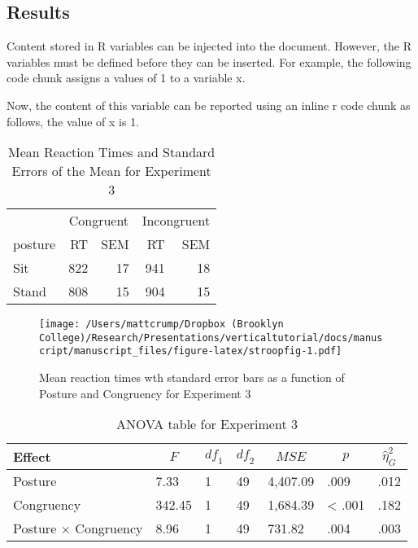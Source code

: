 \documentclass[
  man]{apa6}
\begin{document}
\hypertarget{results}{%
\subsection{Results}\label{results}}

Content stored in R variables can be injected into the document. However, the R variables must be defined before they can be inserted. For example, the following code chunk assigns a values of 1 to a variable x.

Now, the content of this variable can be reported using an inline r code chunk as follows, the value of x is 1.

\begin{table}

\caption{\label{tab:meanstable}Mean Reaction Times and Standard Errors of the Mean for Experiment 3}
\centering
\begin{tabular}[t]{lrrrr}
\toprule
\multicolumn{1}{c}{ } & \multicolumn{2}{c}{Congruent} & \multicolumn{2}{c}{Incongruent} \\
\cmidrule(l{3pt}r{3pt}){2-3} \cmidrule(l{3pt}r{3pt}){4-5}
posture & RT & SEM & RT & SEM\\
\midrule
Sit & 822 & 17 & 941 & 18\\
Stand & 808 & 15 & 904 & 15\\
\bottomrule
\end{tabular}
\end{table}

\begin{figure}
\centering
\texttt{[image: /Users/mattcrump/Dropbox (Brooklyn College)/Research/Presentations/verticaltutorial/docs/manuscript/manuscript\_files/figure-latex/stroopfig-1.pdf]}
\caption{\label{fig:stroopfig}Mean reaction times wth standard error bars as a function of Posture and Congruency for Experiment 3}
\end{figure}

\begin{table}[tbp]
\begin{center}
\begin{threeparttable}
\caption{\label{tab:aovtable}ANOVA table for Experiment 3}
\begin{tabular}{lllllll}
\toprule
Effect & \multicolumn{1}{c}{$F$} & \multicolumn{1}{c}{$\mathit{df}_1$} & \multicolumn{1}{c}{$\mathit{df}_2$} & \multicolumn{1}{c}{$\mathit{MSE}$} & \multicolumn{1}{c}{$p$} & \multicolumn{1}{c}{$\hat{\eta}^2_G$}\\
\midrule
Posture & 7.33 & 1 & 49 & 4,407.09 & .009 & .012\\
Congruency & 342.45 & 1 & 49 & 1,684.39 & < .001 & .182\\
Posture $\times$ Congruency & 8.96 & 1 & 49 & 731.82 & .004 & .003\\
\bottomrule
\end{tabular}
\end{threeparttable}
\end{center}
\end{table}
\end{document}

